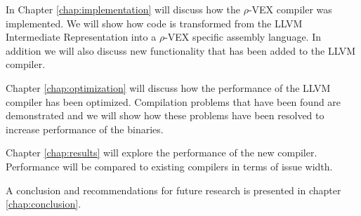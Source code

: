 In Chapter \ref{chap:implementation} will discuss how the $\rho$-VEX compiler was implemented. We will show how code is transformed from the LLVM Intermediate Representation into a $\rho$-VEX specific assembly language. In addition we will also discuss new functionality that has been added to the LLVM compiler.

Chapter \ref{chap:optimization} will discuss how the performance of the LLVM compiler has been optimized. Compilation problems that have been found are demonstrated and we will show how these problems have been resolved to increase performance of the binaries.

Chapter \ref{chap:results} will explore the performance of the new compiler. Performance will be compared to existing compilers in terms of issue width. 

A conclusion and recommendations for future research is presented in chapter \ref{chap:conclusion}.  


\acresetall
